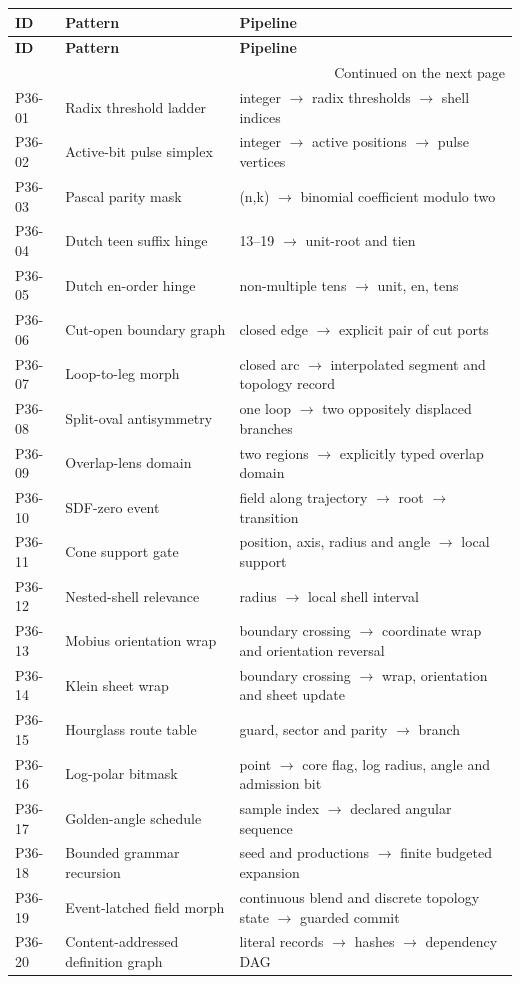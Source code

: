 \begin{longtable}{@{}p{}p{}p{}@{}}
\toprule\textbf{ID} & \textbf{Pattern} & \textbf{Pipeline}\\\midrule\endfirsthead
\toprule\textbf{ID} & \textbf{Pattern} & \textbf{Pipeline}\\\midrule\endhead
\midrule\multicolumn{3}{r}{\small Continued on the next page}\\\endfoot\bottomrule\endlastfoot
P36-01 & Radix threshold ladder & integer $\to$ radix thresholds $\to$ shell indices\\[5pt]
P36-02 & Active-bit pulse simplex & integer $\to$ active positions $\to$ pulse vertices\\[5pt]
P36-03 & Pascal parity mask & (n,k) $\to$ binomial coefficient modulo two\\[5pt]
P36-04 & Dutch teen suffix hinge & 13--19 $\to$ unit-root and tien\\[5pt]
P36-05 & Dutch en-order hinge & non-multiple tens $\to$ unit, en, tens\\[5pt]
P36-06 & Cut-open boundary graph & closed edge $\to$ explicit pair of cut ports\\[5pt]
P36-07 & Loop-to-leg morph & closed arc $\to$ interpolated segment and topology record\\[5pt]
P36-08 & Split-oval antisymmetry & one loop $\to$ two oppositely displaced branches\\[5pt]
P36-09 & Overlap-lens domain & two regions $\to$ explicitly typed overlap domain\\[5pt]
P36-10 & SDF-zero event & field along trajectory $\to$ root $\to$ transition\\[5pt]
P36-11 & Cone support gate & position, axis, radius and angle $\to$ local support\\[5pt]
P36-12 & Nested-shell relevance & radius $\to$ local shell interval\\[5pt]
P36-13 & Mobius orientation wrap & boundary crossing $\to$ coordinate wrap and orientation reversal\\[5pt]
P36-14 & Klein sheet wrap & boundary crossing $\to$ wrap, orientation and sheet update\\[5pt]
P36-15 & Hourglass route table & guard, sector and parity $\to$ branch\\[5pt]
P36-16 & Log-polar bitmask & point $\to$ core flag, log radius, angle and admission bit\\[5pt]
P36-17 & Golden-angle schedule & sample index $\to$ declared angular sequence\\[5pt]
P36-18 & Bounded grammar recursion & seed and productions $\to$ finite budgeted expansion\\[5pt]
P36-19 & Event-latched field morph & continuous blend and discrete topology state $\to$ guarded commit\\[5pt]
P36-20 & Content-addressed definition graph & literal records $\to$ hashes $\to$ dependency DAG\\[5pt]
\end{longtable}
